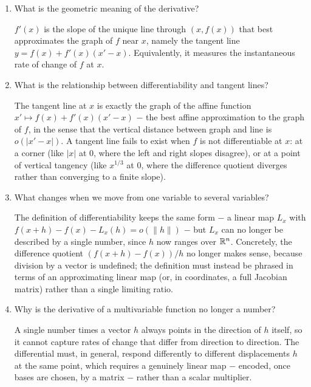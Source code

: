 \documentclass{essay}
\begin{document}
\begin{enumerate}[leftmargin=*, itemsep=8pt]
\item What is the geometric meaning of the derivative?
\begin{answer}
\(f'(x)\) is the slope of the unique line through \((x,f(x))\) that best approximates the graph of \(f\) near \(x\), namely the tangent line \(y=f(x)+f'(x)(x'-x)\). Equivalently, it measures the instantaneous rate of change of \(f\) at \(x\).
\end{answer}

\item What is the relationship between differentiability and tangent lines?
\begin{answer}
The tangent line at \(x\) is exactly the graph of the affine function \(x'\mapsto f(x)+f'(x)(x'-x)\) \(-\) the best affine approximation to the graph of \(f\), in the sense that the vertical distance between graph and line is \(o(|x'-x|)\). A tangent line fails to exist when \(f\) is not differentiable at \(x\): at a corner (like \(|x|\) at \(0\), where the left and right slopes disagree), or at a point of vertical tangency (like \(x^{1/3}\) at \(0\), where the difference quotient diverges rather than converging to a finite slope).
\end{answer}

\item What changes when we move from one variable to several variables?
\begin{answer}
The definition of differentiability keeps the same form \(-\) a linear map \(L_x\) with \(f(x+h)-f(x)-L_x(h)=o(\|h\|)\) \(-\) but \(L_x\) can no longer be described by a single number, since \(h\) now ranges over \(\mathbb{R}^n\). Concretely, the difference quotient \((f(x+h)-f(x))/h\) no longer makes sense, because division by a vector is undefined; the definition must instead be phrased in terms of an approximating linear map (or, in coordinates, a full Jacobian matrix) rather than a single limiting ratio.
\end{answer}

\item Why is the derivative of a multivariable function no longer a number?
\begin{answer}
A single number times a vector \(h\) always points in the direction of \(h\) itself, so it cannot capture rates of change that differ from direction to direction. The differential must, in general, respond differently to different displacements \(h\) at the same point, which requires a genuinely linear map \(-\) encoded, once bases are chosen, by a matrix \(-\) rather than a scalar multiplier.
\end{answer}


\end{enumerate}
\end{document}

